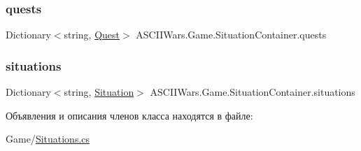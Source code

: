 \subsubsection{\texorpdfstring{quests}{quests}}
{\footnotesize\ttfamily Dictionary$<$string, \hyperlink{class_a_s_c_i_i_wars_1_1_game_1_1_quest}{Quest}$>$ A\+S\+C\+I\+I\+Wars.\+Game.\+Situation\+Container.\+quests}

\hypertarget{class_a_s_c_i_i_wars_1_1_game_1_1_situation_container_a24a982285b5782ecee43e98205d056c1}{}\label{class_a_s_c_i_i_wars_1_1_game_1_1_situation_container_a24a982285b5782ecee43e98205d056c1} 
\subsubsection{\texorpdfstring{situations}{situations}}
{\footnotesize\ttfamily Dictionary$<$string, \hyperlink{class_a_s_c_i_i_wars_1_1_game_1_1_situation}{Situation}$>$ A\+S\+C\+I\+I\+Wars.\+Game.\+Situation\+Container.\+situations}



Объявления и описания членов класса находятся в файле\+:\begin{DoxyCompactItemize}
\item 
Game/\hyperlink{_situations_8cs}{Situations.\+cs}\end{DoxyCompactItemize}
